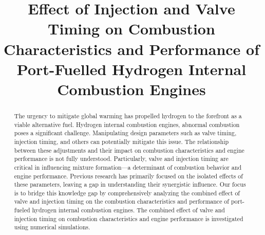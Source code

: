 \documentclass[conference]{IEEEtran}
\begin{document}
\title{Effect of Injection and Valve Timing on Combustion Characteristics and Performance of Port-Fuelled Hydrogen Internal Combustion Engines
}

\author{
\and
{}
\and
{}
\and
{}
\and
{}
}

\maketitle

\begin{abstract}
The urgency to mitigate global warming has propelled hydrogen to the forefront as a viable alternative fuel. Hydrogen internal combustion engines, abnormal combustion poses a significant challenge. Manipulating design parameters such as valve timing, injection timing, and others can potentially mitigate this issue. The relationship between these adjustments and their impact on combustion characteristics and engine performance is not fully understood. Particularly, valve and injection timing are critical in influencing mixture formation—a determinant of combustion behavior and engine performance. Previous research has primarily focused on the isolated effects of these parameters, leaving a gap in understanding their synergistic influence. Our focus is to bridge this knowledge gap by comprehensively analyzing the combined effect of valve and injection timing on the combustion characteristics and performance of port-fueled hydrogen internal combustion engines. The combined effect of valve and injection timing on combustion characteristics and engine performance is investigated using numerical simulations.
\end{abstract}
\end{document}
